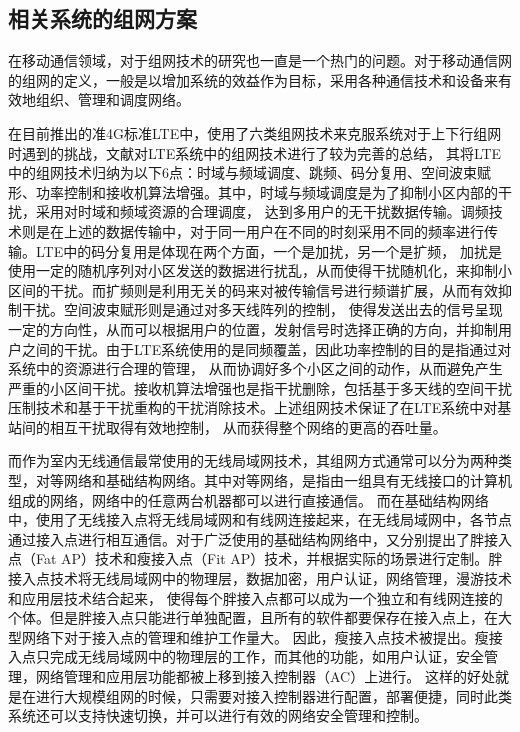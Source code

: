 \subsection{相关系统的组网方案}
在移动通信领域，对于组网技术的研究也一直是一个热门的问题。对于移动通信网的组网的定义，一般是以增加系统的效益作为目标，采用各种通信技术和设备来有效地组织、管理和调度网络。

在目前推出的准4G标准LTE中，使用了六类组网技术来克服系统对于上下行组网时遇到的挑战，文献\cite{LiuXiaoFeng2010}对LTE系统中的组网技术进行了较为完善的总结，
其将LTE中的组网技术归纳为以下6点：时域与频域调度、跳频、码分复用、空间波束赋形、功率控制和接收机算法增强。其中，时域与频域调度是为了抑制小区内部的干扰，采用对时域和频域资源的合理调度，
达到多用户的无干扰数据传输。调频技术则是在上述的数据传输中，对于同一用户在不同的时刻采用不同的频率进行传输。LTE中的码分复用是体现在两个方面，一个是加扰，另一个是扩频，
加扰是使用一定的随机序列对小区发送的数据进行扰乱，从而使得干扰随机化，来抑制小区间的干扰。而扩频则是利用无关的码来对被传输信号进行频谱扩展，从而有效抑制干扰。空间波束赋形则是通过对多天线阵列的控制，
使得发送出去的信号呈现一定的方向性，从而可以根据用户的位置，发射信号时选择正确的方向，并抑制用户之间的干扰。由于LTE系统使用的是同频覆盖，因此功率控制的目的是指通过对系统中的资源进行合理的管理，
从而协调好多个小区之间的动作，从而避免产生严重的小区间干扰。接收机算法增强也是指干扰删除，包括基于多天线的空间干扰压制技术和基于干扰重构的干扰消除技术。上述组网技术保证了在LTE系统中对基站间的相互干扰取得有效地控制，
从而获得整个网络的更高的吞吐量。

而作为室内无线通信最常使用的无线局域网技术，其组网方式通常可以分为两种类型，对等网络和基础结构网络\cite{LiHaoLing2008ap}。其中对等网络，是指由一组具有无线接口的计算机组成的网络，网络中的任意两台机器都可以进行直接通信。
而在基础结构网络中，使用了无线接入点将无线局域网和有线网连接起来，在无线局域网中，各节点通过接入点进行相互通信。对于广泛使用的基础结构网络中，又分别提出了胖接入点（Fat AP）技术和瘦接入点（Fit AP）技术\cite{LiHaoLing2008ap}，并根据实际的场景进行定制。胖接入点技术将无线局域网中的物理层，数据加密，用户认证，网络管理，漫游技术和应用层技术结合起来，
使得每个胖接入点都可以成为一个独立和有线网连接的个体。但是胖接入点只能进行单独配置，且所有的软件都要保存在接入点上，在大型网络下对于接入点的管理和维护工作量大。
因此，瘦接入点技术被提出。瘦接入点只完成无线局域网中的物理层的工作，而其他的功能，如用户认证，安全管理，网络管理和应用层功能都被上移到接入控制器（AC）上进行。
这样的好处就是在进行大规模组网的时候，只需要对接入控制器进行配置，部署便捷，同时此类系统还可以支持快速切换，并可以进行有效的网络安全管理和控制。

